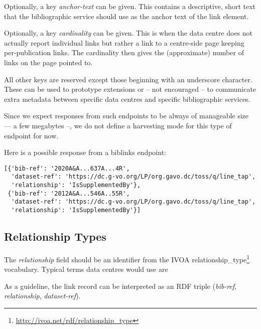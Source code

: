 \documentclass[11pt,a4paper]{ivoa}
\def\vocterm#1{\textit{\color{termcolor}#1}}
\def\vocterm{\startvocterm\realvocterm}
\def\realvocterm#1{\textit{\color{termcolor}#1}\endvocterm}
\gdef\breakablecolon{:\hskip0pt}
\gdef\startvocterm{\begingroup
  \catcode`\:=\active\let:=\breakablecolon}
\gdef\endvocterm{\endgroup}
\begin{document}
Optionally, a key \textit{anchor-text} can be given.  This contains a
descriptive, short text that the bibliographic service should use as
the anchor text of the link element.

Optionally, a key \textit{cardinality} can be given.  This is when the
data centre does not actually report individual links but rather a link
to a centre-side page keeping per-publication links.  The cardinality
then gives the (approximate) number of links on the page pointed to.

All other keys are reserved except those beginning with an underscore
character.  These can be used to prototype extensions or -- not
encouraged -- to communicate extra metadata between specific data
centres and specific bibliographic services.

Since we expect responses from such endpoints to be always of manageable
size –– a few megabytes --, we do not define a harvesting mode for this
type of endpoint for now.

Here is a possible response from a biblinks endpoint:

\begin{lstlisting}[basicstyle=\footnotesize]
[{'bib-ref': '2020A&A...637A...4R',
  'dataset-ref': 'https://dc.g-vo.org/LP/org.gavo.dc/toss/q/line_tap',
  'relationship': 'IsSupplementedBy'},
 {'bib-ref': '2012A&A...546A..55R',
  'dataset-ref': 'https://dc.g-vo.org/LP/org.gavo.dc/toss/q/line_tap',
  'relationship': 'IsSupplementedBy'}]
\end{lstlisting}


\subsection{Relationship Types}

The \textit{relationship} field should be an identifier from the IVOA
relationship\_type\footnote{\url{http://ivoa.net/rdf/relationship_type}}
vocabulary.  Typical terms data centres would use are


As a guideline, the link record can be interpreted as an RDF triple
(\textit{bib-ref}, \textit{relationship}, \textit{dataset-ref}).
\end{document}
